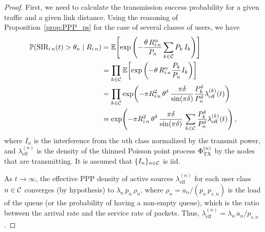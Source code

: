 \begin{proof}
    First, we need to calculate the transmission success probability for a given traffic and a given link distance.
    Using the reasoning of Proposition~\ref{prop:PPP_ps} for the case of several classes of users, we have
    \begin{align} \label{eq:P_SIR}
    	\P(\text{SIR}_{i\,n}(t)>\theta_n \mid R_{i\,n}) &= \E\!\left[\exp\left(-\frac{\theta\,R_{i\,n}^\alpha}{P_n} \sum_{k\in\cal{C}} P_k\,I_k\right)\right]\nonumber\\
        	&= \prod_{k\in\cal{C}} \E\!\left[\exp\left(-\theta\,R_{i\,n}^\alpha\frac{P_k}{P_n} I_k\right)\right] \nonumber\\
            &= \prod_{k\in\cal{C}} \exp\!\left( - \pi R_{i\,n}^2\, \theta^{\delta}\,\frac{\pi\delta}{\sin(\pi\delta)} \frac{P_k^\delta}{P_n^\delta}\lambda_\mathrm{eff}^{(k)}(t)\right) \nonumber\\
        	&= \exp\!\left( - \pi R_{i\,n}^2\,\theta^{\delta}\,\frac{\pi\delta}{\sin(\pi\delta)} \,\sum_{k\in\cal{C}}\frac{P_k^\delta}{P_n^\delta}\lambda_\mathrm{eff}^{(k)}(t)\right),
    \end{align}
    where $I_n$ is the interference from the $n$th class normalized by the transmit power, and $\lambda_{\mathrm{eff}}^{(n)}$ is the density of the thinned Poisson point process $\Phi_\TX^{(n)}$ by the nodes that are transmitting.
    It is assumed that $\{I_n\}_{n \in \cal{C}}$ is iid.

    As $t\to\infty$, the effective PPP density of active sources $\lambda_\mathrm{eff}^{(n)}$ for each user class $n\in\cal{C}$ converges (by hypothesis) to $\lambda_n\,p_n\,\rho_n$, where $\rho_n = a_n/(p_n\,p_{s,n})$ is the load of the queue (or the probability of having a non-empty queue), which is the ratio between the arrival rate and the service rate of packets. Thus, $\lambda_\mathrm{eff}^{(n)} = \lambda_n\,a_n/p_{s,n}$.


\end{proof}
